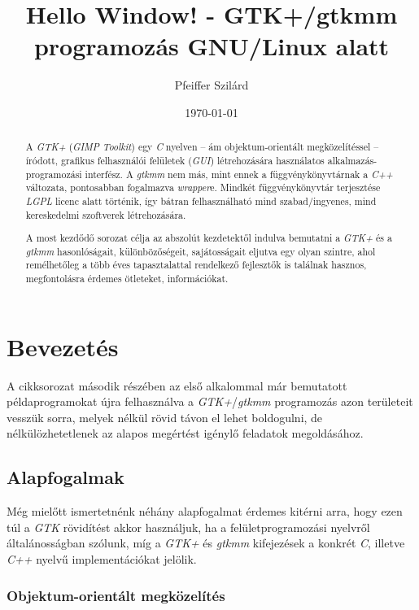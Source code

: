 \documentclass[a4paper,10pt]{article}
\title{Hello Window! - GTK+/gtkmm programozás GNU/Linux alatt}
\author{Pfeiffer Szilárd}
\date{\today}
\begin{document}
\maketitle

\begin{abstract}
A \textit{GTK+} (\textit{GIMP Toolkit}) egy \textit{C} nyelven -- ám objektum-orientált megközelítéssel -- íródott, grafikus felhasználói felületek (\textit{GUI}) létrehozására használatos alkalmazás-programozási interfész. A \textit{gtkmm} nem más, mint ennek a függvénykönyvtárnak a \textit{C++} változata, pontosabban fogalmazva \textit{wrapper}e. Mindkét függvénykönyvtár terjesztése \textit{LGPL} licenc alatt történik, így bátran felhasználható mind szabad/ingyenes, mind kereskedelmi szoftverek létrehozására.

A most kezdődő sorozat célja az abszolút kezdetektől indulva bemutatni a \textit{GTK+} és a \textit{gtkmm} hasonlóságait, különbözőségeit, sajátosságait eljutva egy olyan szintre, ahol remélhetőleg a több éves tapasztalattal rendelkező fejlesztők is találnak hasznos, megfontolásra érdemes ötleteket, információkat.
\end{abstract}

\newpage

\tableofcontents

\newpage

\section{Bevezetés}

A cikksorozat második részében az első alkalommal már bemutatott példaprogramokat újra felhasználva a \textit{GTK+}/\textit{gtkmm} programozás azon területeit vesszük sorra, melyek nélkül rövid távon el lehet boldogulni, de nélkülözhetetlenek az alapos megértést igénylő feladatok megoldásához.

\subsection{Alapfogalmak}

Még mielőtt ismertetnénk néhány alapfogalmat érdemes kitérni arra, hogy ezen túl a \textit{GTK} rövidítést akkor használjuk, ha a felületprogramozási nyelvről általánosságban szólunk, míg a \textit{GTK+} és \textit{gtkmm} kifejezések a konkrét \textit{C}, illetve \textit{C++} nyelvű implementációkat jelölik.

\subsubsection{Objektum-orientált megközelítés}
\end{document}
